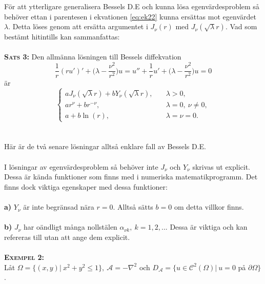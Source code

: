 \documentclass{article}
\begin{document}
För att ytterligare generalisera Bessels D.E och kunna lösa egenvärdesproblem så behöver ettan i parentesen i ekvationen \eqref{eq:ek22} kunna ersättas mot egenvärdet $\lambda$. Detta löses genom att ersätta argumentet i $J_{\nu}(r)$ med $J_{\nu}(\sqrt{\lambda}r)$. Vad som bestämt hitintills kan sammanfattas:\\ \\
\textbf{\textsc{Sats 3:}} Den allmänna lösningen till Bessels diffekvation
\begin{equation}\label{eq:ek23}
    \frac{1}{r}(ru')'+\Big(\lambda-\frac{\nu^2}{r^2}\Big)u=u''+\frac{1}{r}u'+\Big(\lambda-\frac{\nu^2}{r^2}\Big)u=0
\end{equation}
är
\begin{equation}\label{eq:ek24}
    \begin{cases}
       aJ_{\nu}(\sqrt{\lambda}r)+bY_{\nu}(\sqrt{\lambda}r), \quad &\lambda>0,\\ 
       ar^{\nu}+br^{-\nu}, &\lambda=0, \ \nu\neq 0,\\
       a+b\ln(r), &\lambda=\nu=0.
    \end{cases}
\end{equation}\\ \\

Här är de två senare lösningar alltså enklare fall av Bessels D.E.\\ \\
I lösningar av egenvärdesproblem så behöver inte $J_{\nu}$ och $Y_{\nu}$ skrivas ut explicit. Dessa är kända funktioner som finns med i numeriska matematikprogramm. Det finns dock viktiga egenskaper med dessa funktioner:\\ \\
\textbf{a)} $Y_{\nu}$ är inte begränsad nära $r=0$. Alltså sätts $b=0$ om detta villkor finns.\\ \\
\textbf{b)} $J_{\nu}$ har oändligt många nollstälen $\alpha_{\nu k}, \ k=1,2,...$ Dessa är viktiga och kan refereras till utan att ange dem explicit.\\ \\
\textbf{\textsc{Exempel 2:}}\\
Låt $\Omega=\{(x,y)| \ x^2+y^2\leq1\}, \ \mathcal{A}=-\nabla^2$ och $D_{\mathcal{A}}=\{u\in\mathcal{C}^2(\Omega)| \ u=0 $ på $\partial\Omega\}$.
\end{document}
